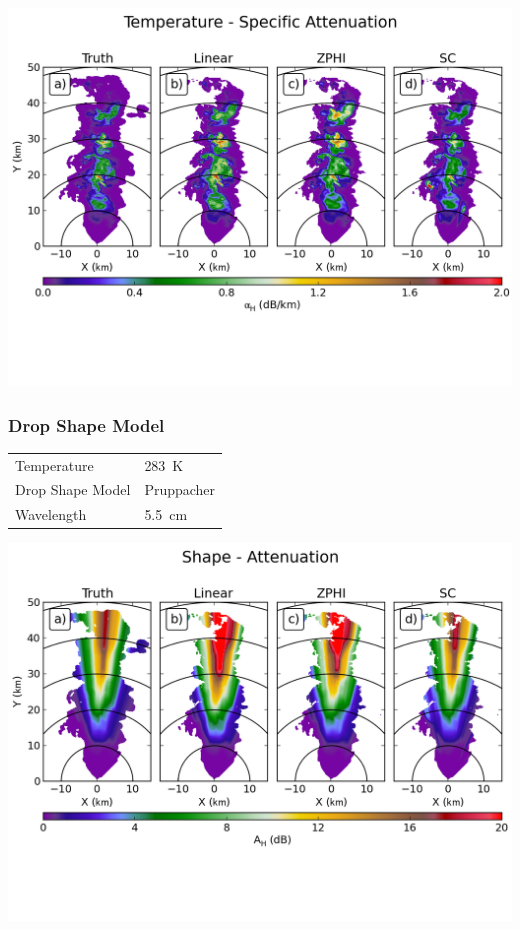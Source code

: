 \documentclass[red]{beamer}
\begin{document}
\begin{frame}
	\begin{center}
		\includegraphics[scale=0.55]{figures/C_Temperature_Specific_Attenuation.png}
	\end{center}
\end{frame}

\begin{frame}
	\frametitle{Drop Shape Model}
	\begin{center}
	    \begin{tabular}{ | l | l | }
	        \hline
	        Temperature & \SI{283}{\kelvin} \\
	        Drop Shape Model & Pruppacher \\
	        Wavelength & \SI{5.5}{\centi\meter} \\
			\hline
	    \end{tabular}
	\end{center}	
\end{frame}

\begin{frame}
	\begin{center}
		\includegraphics[scale=0.55]{figures/C_Shape_Attenuation.png}
	\end{center}
\end{frame}
\end{document}
